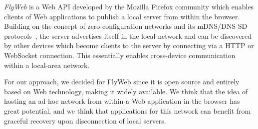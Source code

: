 \textit{FlyWeb} is a Web API developed by the Mozilla Firefox community which enables clients of Web applications to publish a local server from within the browser.
Building on the concept of zero-configuration networks and its mDNS/DNS-SD protocols~\cite{rfc6762, rfc6763}, the server advertises itself in the local network and can be discovered by other devices which become clients to the server by connecting via a HTTP or WebSocket connection.
This essentially enables cross-device communication within a local-area network.

For our approach, we decided for FlyWeb since it is open source and entirely based on Web technology, making it widely available.
We think that the idea of hosting an ad-hoc network from within a Web application in the browser has great potential, and we think that applications for this network can benefit from graceful recovery upon disconnection of local servers.
